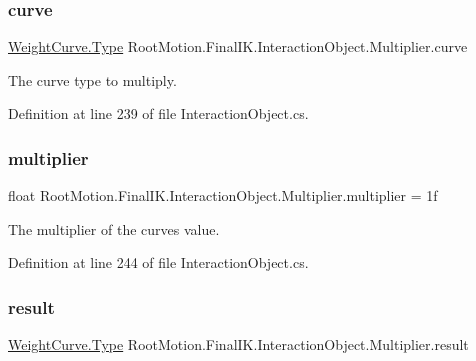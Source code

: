 \subsubsection{\texorpdfstring{curve}{curve}}
{\footnotesize\ttfamily \mbox{\hyperlink{class_root_motion_1_1_final_i_k_1_1_interaction_object_1_1_weight_curve_a74c8be2e80ace86b130c88e275300b27}{Weight\+Curve.\+Type}} Root\+Motion.\+Final\+I\+K.\+Interaction\+Object.\+Multiplier.\+curve}



The curve type to multiply. 



Definition at line 239 of file Interaction\+Object.\+cs.

\mbox{\label{class_root_motion_1_1_final_i_k_1_1_interaction_object_1_1_multiplier_a877404b8510c6d2ba7e998c931620747}} 
\subsubsection{\texorpdfstring{multiplier}{multiplier}}
{\footnotesize\ttfamily float Root\+Motion.\+Final\+I\+K.\+Interaction\+Object.\+Multiplier.\+multiplier = 1f}



The multiplier of the curve\textquotesingle{}s value. 



Definition at line 244 of file Interaction\+Object.\+cs.

\mbox{\label{class_root_motion_1_1_final_i_k_1_1_interaction_object_1_1_multiplier_acd66cad76ca6528529f795b8c90849f4}} 
\subsubsection{\texorpdfstring{result}{result}}
{\footnotesize\ttfamily \mbox{\hyperlink{class_root_motion_1_1_final_i_k_1_1_interaction_object_1_1_weight_curve_a74c8be2e80ace86b130c88e275300b27}{Weight\+Curve.\+Type}} Root\+Motion.\+Final\+I\+K.\+Interaction\+Object.\+Multiplier.\+result}



